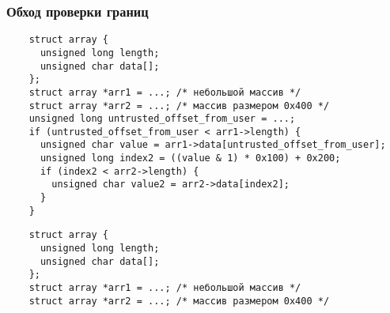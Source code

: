 \subsubsection{Обход проверки границ}
\begin{frame}[fragile]{\insertsubsubsection}

  \begin{verbatim}
    struct array {
      unsigned long length;
      unsigned char data[];
    };
    struct array *arr1 = ...; /* небольшой массив */
    struct array *arr2 = ...; /* массив размером 0x400 */
    unsigned long untrusted_offset_from_user = ...;
    if (untrusted_offset_from_user < arr1->length) {
      unsigned char value = arr1->data[untrusted_offset_from_user];
      unsigned long index2 = ((value & 1) * 0x100) + 0x200;
      if (index2 < arr2->length) {
        unsigned char value2 = arr2->data[index2];
      }
    }
  \end{verbatim}

\end{frame}

\begin{frame}[fragile]{\insertsubsubsection}

  \begin{verbatim}
    struct array {
      unsigned long length;
      unsigned char data[];
    };
    struct array *arr1 = ...; /* небольшой массив */
    struct array *arr2 = ...; /* массив размером 0x400 */
  \end{verbatim}

\end{frame}

